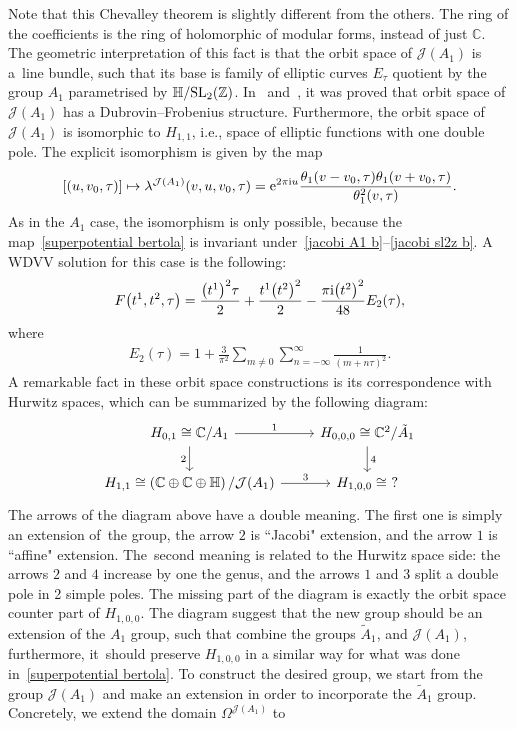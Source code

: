 \documentclass[10pt,a4paper]{amsart}
\numberwithin{equation}{section}
\newcommand{\Ja}{\mathcal{J}}
\begin{document}
Note that this Chevalley theorem is slightly different from the others. The ring of the coefficients is the ring of holomorphic of modular forms, instead of just $\mathbb{C}$. The geometric interpretation of this fact is that the orbit space of $\Ja(A_1)$ is a~line bundle, such that its base is family of elliptic curves $E_{\tau}$ quotient by the group $A_1$ parametrised by $\mathbb{H}/{\rm SL}_2(\mathbb{Z})$. In~\cite{BertolaM.1} and~\cite{BertolaM.2}, it was proved that orbit space of $\Ja(A_1)$ has a Dubrovin--Frobenius structure. Furthermore, the orbit space of $\Ja(A_1)$ is isomorphic to $H_{1,1}$, i.e., space of elliptic functions with one double pole. The explicit isomorphism is given by the map
 \begin{gather}\label{superpotential bertola}
[(u,v_0,\tau)]\mapsto \lambda^{\Ja(A_1)}(v,u,v_0,\tau)={\rm e}^{2\pi {\rm i} u}\frac{\theta_1(v-v_0,\tau)\theta_1(v+v_0,\tau)}{\theta_1^2(v,\tau)}.
\end{gather}
As in the $A_1$ case, the isomorphism is only possible, because the map~\eqref{superpotential bertola} is invariant under~\eqref{jacobi A1 b}--\eqref{jacobi sl2z b}. A WDVV solution for this case is the following:
 \begin{gather}\label{WDVV bertola}
F\big(t^1,t^2,\tau\big)=\frac{\big(t^1\big)^2\tau}{2}+\frac{t^1\big(t^2\big)^2}{2}-\frac{\pi {\rm i}\big(t^2\big)^2}{48}E_2(\tau),
\end{gather}
where
 \begin{gather*}
E_2(\tau)=1+\frac{3}{\pi^2}\sum_{m\neq 0}\sum_{n=-\infty}^{\infty}\frac{1}{(m+n\tau)^2}.
\end{gather*}
A remarkable fact in these orbit space constructions is its correspondence with Hurwitz spaces, which can be summarized by the following diagram:
\[
 \begin{tikzcd}
 H_{0,1}\cong\mathbb{C}/A_1 \arrow{r}{1} \arrow[swap]{d}{2} & H_{0,0,0}\cong\mathbb{C}^2/\tilde A_1 \arrow{d}{4} \\
H_{1,1}\cong\left(\mathbb{C}\oplus\mathbb{C}\oplus\mathbb{H}\right)/\Ja(A_1) \arrow{r}{3}& H_{1,0,0}\cong\ ?
 \end{tikzcd}
\]
The arrows of the diagram above have a double meaning. The first one is simply an extension of~the group, the arrow $2$ is ``Jacobi" extension, and the arrow $1$ is ``affine" extension. The~second meaning is related to the Hurwitz space side: the arrows $2$ and $4$ increase by one the genus, and the arrows $1$ and $3$ split a double pole in 2 simple poles. The missing part of the diagram is exactly the orbit space counter part of $H_{1,0,0}$. The diagram suggest that the new group should be an extension of the $A_1$ group, such that combine the groups $\tilde A_1$, and $\Ja(A_1)$, furthermore, it~should preserve $H_{1,0,0}$ in a similar way for what was done in~\eqref{superpotential bertola}. To construct the desired group, we start from the group $\Ja(A_1)$ and make an extension in order to incorporate the $\tilde A_1$ group. Concretely, we extend the domain $\Omega^{\Ja(A_1)}$ to
\end{document}
